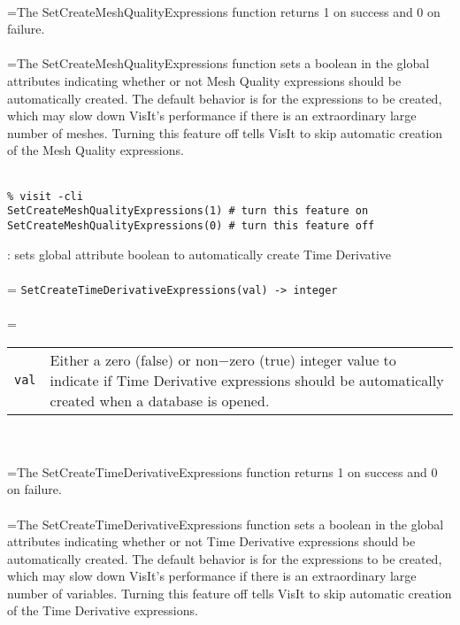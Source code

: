 \documentclass[10pt,a4paper]{report}
\begin{document}
 \\ 
\hangindent=\parindent The SetCreateMeshQualityExpressions function returns 1 on success and 0 on failure. \\[-3mm] 

 \\ 
\hangindent=\parindent The SetCreateMeshQualityExpressions function sets a boolean in the  global attributes indicating whether or not Mesh Quality expressions  should be automatically created. The default behavior is for the  expressions to be created, which may slow down VisIt's performance  if there is an extraordinary large number of meshes.  Turning this  feature off tells VisIt to skip automatic creation of the Mesh Quality  expressions. \\[-3mm] 

\\[-6mm]
\begin{verbatim}% visit -cli
SetCreateMeshQualityExpressions(1) # turn this feature on
SetCreateMeshQualityExpressions(0) # turn this feature off
\end{verbatim}
\newpage


{}
: sets global attribute boolean to automatically create Time Derivative\\[-3mm]

 \\ 
\hangindent=\parindent 
\verb!SetCreateTimeDerivativeExpressions(val) -> integer!\\ [-3mm]

 \\ 
\hangindent=\parindent 
\begin{tabular}{lp{9cm}}
\verb!val! & Either a zero (false) or non$-$zero (true) integer value to indicate if Time Derivative expressions should be automatically created when a  database is opened. \\
\end{tabular} \\[-2mm]


 \\ 
\hangindent=\parindent The SetCreateTimeDerivativeExpressions function returns 1 on success and 0 on failure. \\[-3mm] 

 \\ 
\hangindent=\parindent The SetCreateTimeDerivativeExpressions function sets a boolean in the  global attributes indicating whether or not Time Derivative expressions  should be automatically created. The default behavior is for the  expressions to be created, which may slow down VisIt's performance  if there is an extraordinary large number of variables.  Turning this  feature off tells VisIt to skip automatic creation of the Time Derivative  expressions. \\[-3mm] 
\end{document}
